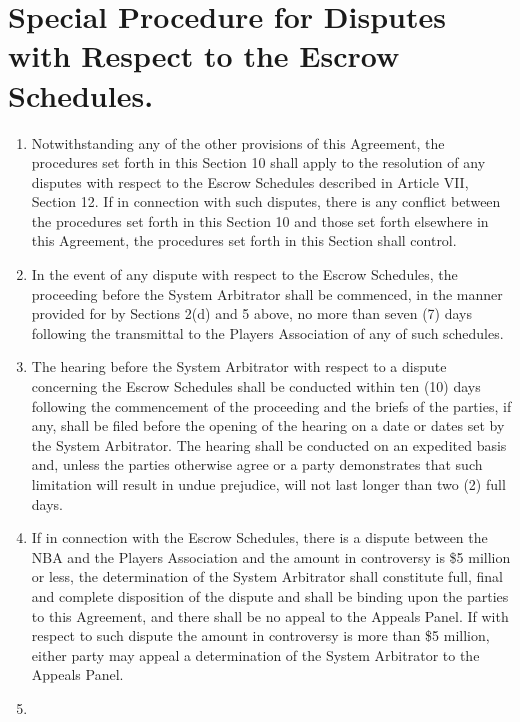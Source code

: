 \documentclass[
]{book}
\providecommand{\tightlist}{%
  \setlength{\itemsep}{0pt}\setlength{\parskip}{0pt}}
\begin{document}
\hypertarget{special-procedure-for-disputes-with-respect-to-the-escrow-schedules.}{%
\section{Special Procedure for Disputes with Respect to the Escrow Schedules.}\label{special-procedure-for-disputes-with-respect-to-the-escrow-schedules.}}

\begin{enumerate}
\def\labelenumi{(\alph{enumi})}
\tightlist
\item
  Notwithstanding any of the other provisions of this Agreement, the procedures set forth in this Section 10 shall apply to the resolution of any disputes with respect to the Escrow Schedules described in Article VII, Section 12. If in connection with such disputes, there is any conflict between the procedures set forth in this Section 10 and those set forth elsewhere in this Agreement, the procedures set forth in this Section shall control.
\item
  In the event of any dispute with respect to the Escrow Schedules, the proceeding before the System Arbitrator shall be commenced, in the manner provided for by Sections 2(d) and 5 above, no more than seven (7) days following the transmittal to the Players Association of any of such schedules.
\item
  The hearing before the System Arbitrator with respect to a dispute concerning the Escrow Schedules shall be conducted within ten (10) days following the commencement of the proceeding and the briefs of the parties, if any, shall be filed before the opening of the hearing on a date or dates set by the System Arbitrator. The hearing shall be conducted on an expedited basis and, unless the parties otherwise agree or a party demonstrates that such limitation will result in undue prejudice, will not last longer than two (2) full days.
\item
  If in connection with the Escrow Schedules, there is a dispute between the NBA and the Players Association and the amount in controversy is \$5 million or less, the determination of the System Arbitrator shall constitute full, final and complete disposition of the dispute and shall be binding upon the parties to this Agreement, and there shall be no appeal to the Appeals Panel. If with respect to such dispute the amount in controversy is more than \$5 million, either party may appeal a determination of the System Arbitrator to the Appeals Panel.
\item

\end{enumerate}
\end{document}
